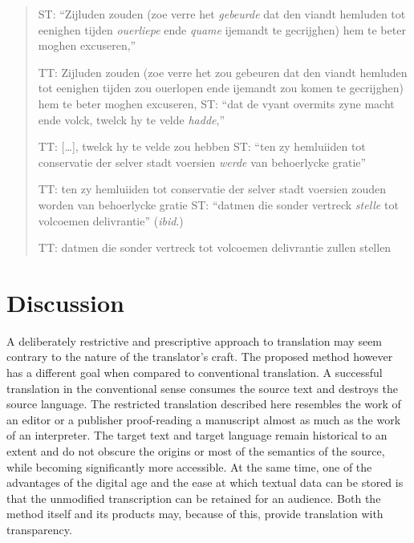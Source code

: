 \begin{paper}
\begin{quote}
ST: ``Zijluden zouden (zoe verre het \emph{gebeurde} dat den viandt
hemluden tot eenighen tijden \emph{ouerliepe} ende \emph{quame} ijemandt
te gecrijghen) hem te beter moghen excuseren,'' 

TT: Zijluden zouden (zoe verre het zou gebeuren dat den viandt
hemluden tot eenighen tijden zou ouerlopen ende ijemandt zou komen
te gecrijghen) hem te beter moghen excuseren,
\vspace{1em}
ST: ``dat de vyant overmits zyne macht ende volck, twelck hy te velde
\emph{hadde},'' 

TT: {[}\ldots{}{]}, twelck hy te velde zou hebben
\vspace{1em}
ST: ``ten zy hemluiiden tot conservatie der selver stadt voersien
\emph{werde} van behoerlycke gratie'' 

TT: ten zy hemluiiden tot conservatie der selver stadt voersien zouden
worden van behoerlycke gratie
\vspace{1em}
ST: ``datmen die sonder vertreck \emph{stelle} tot volcoemen
delivrantie'' (\emph{ibid}.)

TT: datmen die sonder vertreck tot volcoemen delivrantie zullen
stellen
\end{quote}

\section{Discussion}

A deliberately restrictive and prescriptive approach to translation may
seem contrary to the nature of the translator's craft. The proposed
method however has a different goal when compared to conventional
translation. A successful translation in the conventional sense consumes
the source text and destroys the source language. The restricted
translation described here resembles the work of an editor or a
publisher proof-reading a manuscript almost as much as the work of an
interpreter. The target text and target language remain historical to an
extent and do not obscure the origins or most of the semantics of the
source, while becoming significantly more accessible. At the same time,
one of the advantages of the digital age and the ease at which textual
data can be stored is that the unmodified transcription can be retained
for an audience. Both the method itself and its products may, because of
this, provide translation with transparency.


\end{paper}
